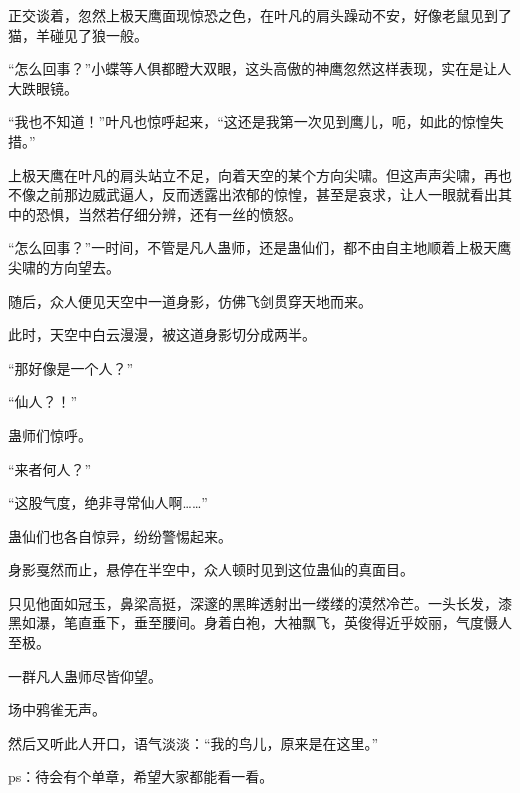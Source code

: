 \begin{this_body}
正交谈着，忽然上极天鹰面现惊恐之色，在叶凡的肩头躁动不安，好像老鼠见到了猫，羊碰见了狼一般。

“怎么回事？”小蝶等人俱都瞪大双眼，这头高傲的神鹰忽然这样表现，实在是让人大跌眼镜。

“我也不知道！”叶凡也惊呼起来，“这还是我第一次见到鹰儿，呃，如此的惊惶失措。”

上极天鹰在叶凡的肩头站立不足，向着天空的某个方向尖啸。但这声声尖啸，再也不像之前那边威武逼人，反而透露出浓郁的惊惶，甚至是哀求，让人一眼就看出其中的恐惧，当然若仔细分辨，还有一丝的愤怒。

“怎么回事？”一时间，不管是凡人蛊师，还是蛊仙们，都不由自主地顺着上极天鹰尖啸的方向望去。

随后，众人便见天空中一道身影，仿佛飞剑贯穿天地而来。

此时，天空中白云漫漫，被这道身影切分成两半。

“那好像是一个人？”

“仙人？！”

蛊师们惊呼。

“来者何人？”

“这股气度，绝非寻常仙人啊……”

蛊仙们也各自惊异，纷纷警惕起来。

身影戛然而止，悬停在半空中，众人顿时见到这位蛊仙的真面目。

只见他面如冠玉，鼻梁高挺，深邃的黑眸透射出一缕缕的漠然冷芒。一头长发，漆黑如瀑，笔直垂下，垂至腰间。身着白袍，大袖飘飞，英俊得近乎姣丽，气度慑人至极。

一群凡人蛊师尽皆仰望。

场中鸦雀无声。

然后又听此人开口，语气淡淡：“我的鸟儿，原来是在这里。”

ps：待会有个单章，希望大家都能看一看。

\end{this_body}
